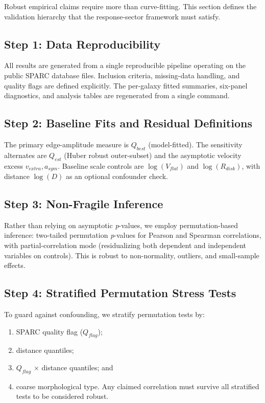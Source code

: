 \documentclass[11pt]{article}
\begin{document}
Robust empirical claims require more than curve-fitting. This section defines the validation hierarchy that the response-sector framework must satisfy.

\subsection{Step 1: Data Reproducibility}\label{step-1-data-reproducibility}

All results are generated from a single reproducible pipeline operating on the public SPARC database files. Inclusion criteria, missing-data handling, and quality flags are defined explicitly. The per-galaxy fitted summaries, six-panel diagnostics, and analysis tables are regenerated from a single command.

\subsection{Step 2: Baseline Fits and Residual Definitions}\label{step-2-baseline-fits-and-residual-definitions}

The primary edge-amplitude measure is \(Q_{best}\) (model-fitted). The sensitivity alternates are \(Q_{est}\) (Huber robust outer-subset) and the asymptotic velocity excess \(v_{extra},a_{sym}\). Baseline scale controls are \(\log\left( V_{flat} \right)\) and \(\log\left( R_{disk} \right)\), with distance \(\log(D)\) as an optional confounder check.

\subsection{Step 3: Non-Fragile Inference}\label{step-3-non-fragile-inference}

Rather than relying on asymptotic \emph{p}-values, we employ permutation-based inference: two-tailed permutation \emph{p}-values for Pearson and Spearman correlations, with partial-correlation mode (residualizing both dependent and independent variables on controls). This is robust to non-normality, outliers, and small-sample effects.

\subsection{Step 4: Stratified Permutation Stress Tests}\label{step-4-stratified-permutation-stress-tests}

To guard against confounding, we stratify permutation tests by:

\begin{enumerate}
\def\labelenumi{(\roman{enumi})}
\item
  SPARC quality flag (\(Q_{flag}\));
\item
  distance quantiles;
\item
  \(Q_{flag}\) × distance quantiles; and
\item
  coarse morphological type. Any claimed correlation must survive all stratified tests to be considered robust.
\end{enumerate}
\end{document}
